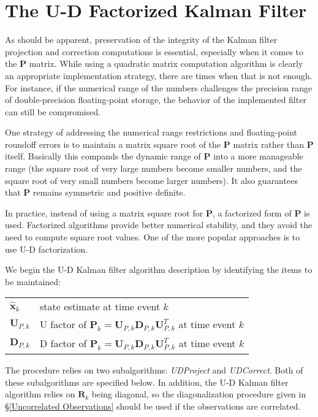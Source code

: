 \section{The U-D Factorized Kalman Filter}
\label{The U-D Factorized Kalman Filter}

As should be apparent, preservation of the integrity of the Kalman filter projection and
correction computations is essential, especially when it comes to the $\mathbf{P}$ matrix.
While using a quadratic matrix computation algorithm is clearly an appropriate
implementation strategy, there are times when that is not enough. For instance, if the
numerical range of the numbers challenges the precision range of double-precision
floating-point storage, the behavior of the implemented filter can still be compromised.

One strategy of addressing the numerical range restrictions and floating-point roundoff
errors is to maintain a matrix square root of the $\mathbf{P}$ matrix rather than
$\mathbf{P}$ itself. Basically this compands the dynamic range of $\mathbf{P}$ into a
more manageable range (the square root of very large numbers become smaller numbers, and
the square root of very small numbers become larger numbers). It also guarantees that
$\mathbf{P}$ remains symmetric and positive definite.

In practice, instead of using a matrix square root for $\mathbf{P}$, a factorized form of
$\mathbf{P}$ is used. Factorized algorithms provide better numerical stability, and they
avoid the need to compute square root values. One of the more popular approaches is to use
U-D factorization.

We begin the U-D Kalman filter algorithm description by identifying the items to be
maintained:

\begingroup
\renewcommand{\arraystretch}{1.25}
\begin{tabular}{l l}
$\hat{\mathbf{x}}_k$ & state estimate at time event $k$ \\
$\mathbf{U}_{P,k}$   & U factor of $\mathbf{P}_k = \mathbf{U}_{P,k} \mathbf{D}_{P,k} \mathbf{U}_{P,k}^T$ at time event $k$ \\
$\mathbf{D}_{P,k}$   & D factor of $\mathbf{P}_k = \mathbf{U}_{P,k} \mathbf{D}_{P,k} \mathbf{U}_{P,k}^T$ at time event $k$
\end{tabular}
\endgroup

The procedure relies on two subalgorithms: \textit{UDProject} and \textit{UDCorrect}.
Both of these subalgorithms are specified below. In addition, the U-D Kalman filter
algorithm relies on $\mathbf{R}_k$ being diagonal, so the diagonalization procedure given
in \S\ref{Uncorrelated Observations} should be used if the observations are correlated.

